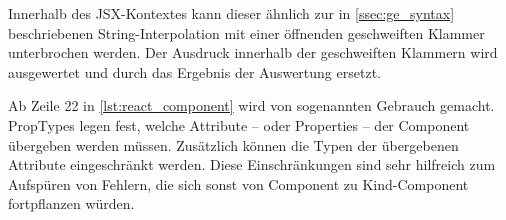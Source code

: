 Innerhalb des JSX-Kontextes kann dieser ähnlich zur in \cref{ssec:ge_syntax}
beschriebenen String-Interpolation mit einer öffnenden geschweiften Klammer
unterbrochen werden.  Der Ausdruck innerhalb der geschweiften Klammern wird
ausgewertet und durch das Ergebnis der Auswertung ersetzt.

Ab Zeile 22 in \cref{lst:react_component} wird von sogenannten
 Gebrauch gemacht.  PropTypes legen fest, welche
Attribute -- oder Properties -- der Component übergeben werden müssen.
Zusätzlich können die Typen der übergebenen Attribute eingeschränkt werden.
Diese Einschränkungen sind sehr hilfreich zum Aufspüren von Fehlern, die sich
sonst von Component zu Kind-Component fortpflanzen würden.
